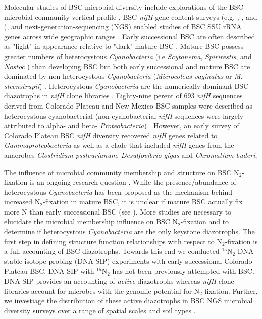 Molecular studies of BSC microbial diversity include explorations of the BSC
microbial community vertical profile \citep{Garcia_Pichel_2003}, BSC
\textit{nifH} gene content surveys (e.g. \citet{14766579}, \citet{Yeager_2012},
\citet{Yeager} and \citet{Steppe_1996}), and next-generation-sequencing (NGS)
enabled studies of BSC SSU rRNA genes across wide geographic ranges
\citep{Garcia_Pichel_2013, Steven_2013}. Early successional  BSC are often
described as "light" in appearance relative to "dark" mature BSC
\citep{Belnap_2002, 14766579}. Mature BSC possess greater numbers of
heterocystous \textit{Cyanobacteria} (i.e \textit{Scytonema},
\textit{Spirirestis}, and \textit{Nostoc} \citep{Yeager, Yeager_2012}) than
developing BSC but both early successional and mature BSC are dominated by
non-heterocystous \textit{Cyanobacteria} (\textit{Microcoleus vaginatus} or
\textit{M. steenstrupii}) \citep{14766579, Garcia_Pichel_2013}.  Heterocystous
\textit{Cyanobacteria} are the numerically dominant BSC diazotrophs in
\textit{nifH} clone libraries \citep{Yeager, 14766579, Yeager_2012}.
Eighty-nine perent of 693 \textit{nifH} sequences derived from Colorado Plateau and
New Mexico BSC samples were described as heterocystous cyanobacterial
(non-cyanobacterial \textit{nifH} sequences were largely attributed to alpha-
and beta- \textit{Proteobacteria}) \citep{Yeager}. However, an early survey of
Colorado Plateau BSC \textit{nifH} diversity recovered \textit{nifH} genes
related to \textit{Gammaproteobacteria} as well as a clade that included
\textit{nifH} genes from the anaerobes \textit{Clostridium pssteurianum},
\textit{Desulfovibrio gigas} and \textit{Chromatium buderi},

The influence of microbial community membership and structure on BSC
N$_{2}$-fixation is an ongoing research question \citep{Belnap28062013}. While
the presence/abundance of heterocystous \textit{Cyanobacteria} has been
proposed as the mechanism behind increased N$_{2}$-fixation in mature BSC, it
is unclear if mature BSC actually fix more N than early successional BSC (see
\citet{15643930}). More studies are necessary to elucidate the microbial
membership influence on BSC N$_{2}$-fixation and to determine if heterocystous
\textit{Cyanobacteria} are the only keystone diazotrophs. The first step in
defining structure function relationships with respect to N$_{2}$-fixation is a
full accounting of BSC diazotrophs. Towards this end we conducted
$^{15}$N$_{2}$ DNA stable isotope probing (DNA-SIP) experiments with early
successional Colorado Plateau BSC.  DNA-SIP with $^{15}$N$_{2}$ has not been
previously attempted with BSC. DNA-SIP provides an accounting of \textit{active}
diazotrophs whereas \textit{nifH} clone libraries account for microbes with the
genomic potential for N$_{2}$-fixation.  Further, we investiage the
distribution of these active diazotrophs in BSC NGS microbial diversity surveys
over a range of spatial scales and soil types \citep{Garcia_Pichel_2013,
Steven_2013}. 
